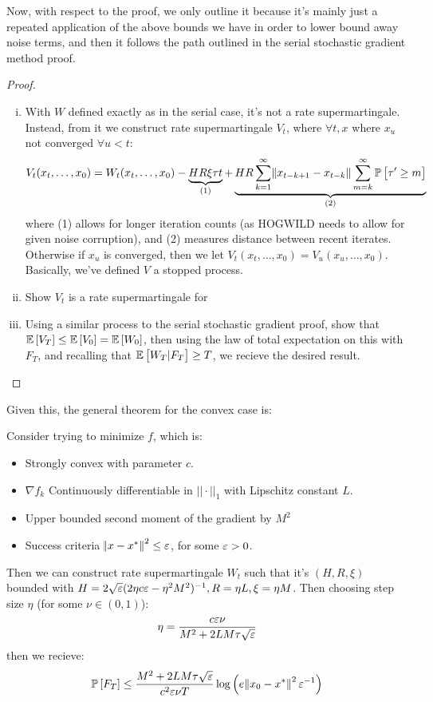 Now, with respect to the proof, we only outline it because it's mainly just
a repeated application of the above bounds we have in order to lower bound away
noise terms, and then it follows the path outlined in the serial stochastic
gradient method proof.
\begin{proof}
  \begin{enumerate}[(i)]
    \item With $W$ defined exactly as in the serial case, it's not a rate
      supermartingale. Instead, from it we construct rate supermartingale $V_t$,
      where $\forall t, x$ where $x_u$ not converged $\forall u < t$:
      \[
        V_t(x_t, \dots, x_0) = W_t(x_t, \dots, x_0) 
        - \underbrace{HR\xi \tau t}_{(1)}
        + \underbrace{
          HR \sum_{k=1}^\infty \norm{x_{t-k+1}-x_{t-k}} \sum_{m=k}^\infty
          \mathbb{P}\left[\tau' \geq m\right]
        }_{(2)}
      \]
      where (1) allows for longer iteration counts (as HOGWILD needs to allow
      for given noise corruption), and (2) measures distance between recent
      iterates. Otherwise if $x_u$ is converged, then we let $V_t(x_t, \dots,
      x_0) = V_u(x_u, \dots, x_0)$. Basically, we've defined $V$ a stopped
      process.
    \item Show $V_t$ is a rate supermartingale for \hogwild
    \item Using a similar process to the serial stochastic gradient proof, show
      that $\mathbb{E}\left[V_T\right] \leq \mathbb{E}\left[V_0\right] = \mathbb{E}\left[W_0\right]$, then using the law of total
      expectation on this with $F_T$, and recalling that $\mathbb{E}\left[W_T | F_T\right] \geq T$,
      we recieve the desired result.
  \end{enumerate}
\end{proof}
Given this, the general theorem for the convex case is:
\begin{theorem} \label{thm:convexconv}
  Consider trying to minimize $f$, which is:
  \begin{itemize}
    \item Strongly convex with parameter $c$.
    \item $\nabla f_k$ Continuously differentiable in $||\cdot||_1$ with
      Lipschitz constant $L$.
    \item Upper bounded second moment of the gradient by $M^2$
    \item Success criteria $\norm{x-x^*}^2 \leq \varepsilon$, for some $\varepsilon > 0$.
  \end{itemize}
  Then we can construct rate supermartingale $W_t$ such that it's $(H,R,\xi)$
  bounded with $H = 2\sqrt{\varepsilon}(2\eta c\varepsilon - \eta^2 M^2)^{-1}, R = \eta L,
  \xi = \eta M$. Then choosing step size $\eta$ (for some $\nu \in (0,1)$):
  \[
    \eta = \frac{c\varepsilon \nu}{M^2 + 2LM\tau\sqrt{\varepsilon}}
  \]
  then we recieve:
  \[
    \mathbb{P}\left[F_T\right] \leq \frac{M^2 + 2LM\tau\sqrt{\varepsilon}}{c^2\varepsilon\nu T} \log
    \left(
      e \norm{x_0 -x^*}^2 \varepsilon^{-1}
    \right)
  \]
\end{theorem}
